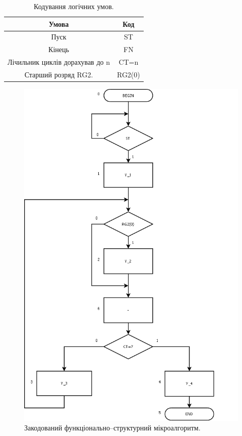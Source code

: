 \documentclass[a4paper, 10pt]{article}
\begin{document}
\begin{table}[h!]
\centering
\begin{tabular}{|c|c|}
\hline
Умова & Код\\
\hline
Пуск & ST \\
\hline
Кінець & FN\\
\hline
Лічильник циклів дорахував до n & CT=n\\
\hline
Старший розряд RG2. & RG2(0)\\
\hline
\end{tabular}
\caption{Кодування логічних умов.}
\end{table}

\begin{figure}[H]
\begin{center}
\includegraphics[scale=0.25]{fsz_alg.png}
\caption{Закодований функціонально--структурний мікроалгоритм.}
\end{center}
\end{figure}
\end{document}
